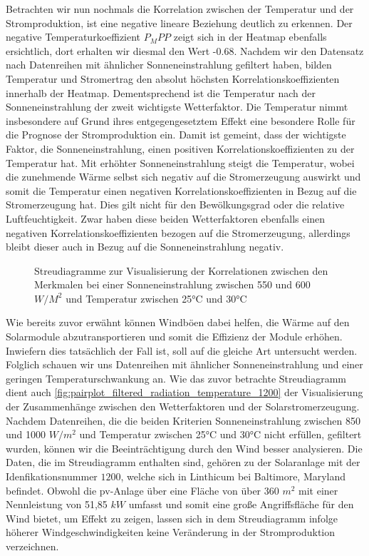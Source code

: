 \documentclass[12pt, a4paper]{article}
\begin{document}
Betrachten wir nun nochmals die Korrelation zwischen der Temperatur und der Stromproduktion, ist eine negative lineare Beziehung deutlich zu erkennen. Der negative Temperaturkoeffizient $P_MPP$ zeigt sich in der Heatmap ebenfalls ersichtlich, dort erhalten wir diesmal den Wert -0.68. Nachdem wir den Datensatz nach Datenreihen mit ähnlicher Sonneneinstrahlung gefiltert haben, bilden Temperatur und Stromertrag den absolut höchsten Korrelationskoeffizienten innerhalb der Heatmap. Dementsprechend ist die Temperatur nach der Sonneneinstrahlung der zweit wichtigste Wetterfaktor. Die Temperatur nimmt insbesondere auf Grund ihres entgegengesetztem Effekt eine besondere Rolle für die Prognose der Stromproduktion ein. Damit ist gemeint, dass der wichtigste Faktor, die Sonneneinstrahlung, einen positiven Korrelationskoeffizienten zu der Temperatur hat. Mit erhöhter Sonneneinstrahlung steigt die Temperatur, wobei die zunehmende Wärme selbst sich negativ auf die Stromerzeugung auswirkt und somit die Temperatur einen negativen Korrelationskoeffizienten in Bezug auf die Stromerzeugung hat. Dies gilt nicht für den Bewölkungsgrad oder die relative Luftfeuchtigkeit. Zwar haben diese beiden Wetterfaktoren ebenfalls einen negativen Korrelationskoeffizienten bezogen auf die Stromerzeugung, allerdings bleibt dieser auch in Bezug auf die Sonneneinstrahlung negativ.

\begin{figure}
\centering
\def\svgwidth{425pt}

\caption{Streudiagramme zur Visualisierung der Korrelationen zwischen den Merkmalen bei einer Sonneneinstrahlung zwischen 550 und 600 $W/ M^2$ und Temperatur zwischen 25°C und 30°C}
\label{fig:pairplot_filtered_radiation_temperature_1200}
\end {figure}

Wie bereits zuvor erwähnt können Windböen dabei helfen, die Wärme auf den Solarmodule abzutransportieren und somit die Effizienz der Module erhöhen. Inwiefern dies tatsächlich der Fall ist, soll auf die gleiche Art untersucht werden. Folglich schauen wir uns Datenreihen mit ähnlicher Sonneneinstrahlung und einer geringen Temperaturschwankung an. Wie das zuvor betrachte Streudiagramm dient auch \autoref{fig:pairplot_filtered_radiation_temperature_1200} der Visualisierung der Zusammenhänge zwischen den Wetterfaktoren und der Solarstromerzeugung. Nachdem Datenreihen, die die beiden Kriterien Sonneneinstrahlung zwischen 850 und 1000 $W/ m^2$ und Temperatur zwischen 25°C und 30°C nicht erfüllen, gefiltert wurden, können wir die Beeinträchtigung durch den Wind besser analysieren. Die Daten, die im Streudiagramm enthalten sind, gehören zu der Solaranlage mit der Idenfikationsnummer $1200$, welche sich in Linthicum bei Baltimore, Maryland befindet. Obwohl die \ac{pv}-Anlage über eine Fläche von über 360 $m^2$ mit einer Nennleistung von 51,85 $kW$ umfasst und somit eine große Angriffsfläche für den Wind bietet, um Effekt zu zeigen, lassen sich in dem Streudiagramm infolge höherer Windgeschwindigkeiten keine Veränderung in der Stromproduktion verzeichnen. 
\end{document}
